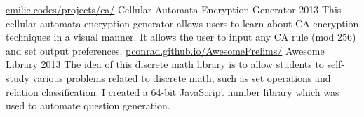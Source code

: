 \begin{cventries}
  \cventry
     {\href{https://emilie.codes/projects/ca/}{emilie.codes/projects/ca/}}
    {Cellular Automata Encryption Generator}
    {}
    {2013}
    {
         This cellular automata encryption generator allows users to learn about CA encryption techniques in a visual manner. It allows the user to input any CA rule (mod 256) and set output preferences.
    }
\cventry
     {\href{http://pconrad.github.io/AwesomePrelims/}{pconrad.github.io/AwesomePrelims/}}
    {Awesome Library}
    {}
    {2013}
    {
         The idea of this discrete math library is to allow students to self-study various problems related to discrete math, such as set operations and relation classification. I created a 64-bit JavaScript number library which was used to automate question generation.
    }


\end{cventries}